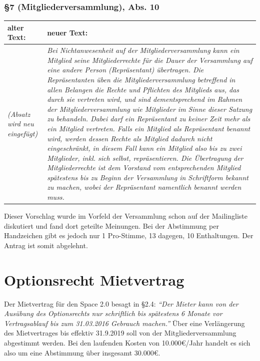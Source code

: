 \documentclass[a4paper,12pt]{scrartcl}
\begin{document}
\newpage
\subsubsection*{§7 (Mitgliederversammlung), Abs. 10}
\begin{longtable}[c]{@{}ll@{}}
\toprule
\begin{minipage}[b]{0.47\columnwidth}\raggedright\strut
alter Text:
\strut\end{minipage} &
\begin{minipage}[b]{0.47\columnwidth}\raggedright\strut
neuer Text:
\strut\end{minipage}\tabularnewline
\midrule
\endhead
\begin{minipage}[t]{0.47\columnwidth}\raggedright\strut
\emph{(Absatz wird neu eingefügt)}
\strut\end{minipage} &
\begin{minipage}[t]{0.47\columnwidth}\raggedright\strut
\emph{Bei Nichtanwesenheit auf der Mitgliederversammlung kann ein Mitglied
seine Mitgliederrechte für die Dauer der Versammlung auf eine andere
Person (Repräsentant) übertragen. Die Repräsentanten üben die
Mitgliederversammlung betreffend in allen Belangen die Rechte und
Pflichten des Mitglieds aus, das durch sie vertreten wird, und sind
dementsprechend im Rahmen der Mitgliederversammlung wie Mitglieder im
Sinne dieser Satzung zu behandeln. Dabei darf ein Repräsentant zu keiner
Zeit mehr als ein Mitglied vertreten. Falls ein Mitglied als
Repräsentant benannt wird, werden dessen Rechte als Mitglied dadurch
nicht eingeschränkt, in diesem Fall kann ein Mitglied also bis zu zwei
Mitglieder, inkl. sich selbst, repräsentieren. Die Übertragung der
Mitgliederrechte ist dem Vorstand vom entsprechenden Mitglied spätestens
bis zu Beginn der Versammlung in Schriftform bekannt zu machen, wobei
der Repräsentant namentlich benannt werden muss.}
\strut\end{minipage}\tabularnewline
\bottomrule
\end{longtable}

Dieser Vorschlag wurde im Vorfeld der Versammlung schon auf der Mailingliste
diskutiert und fand dort geteilte Meinungen. Bei der Abstimmung per Handzeichen
gibt es jedoch nur 1 Pro-Stimme, 13 dagegen, 10 Enthaltungen. Der Antrag ist
somit abgelehnt.


\section{Optionsrecht Mietvertrag}
Der Mietvertrag für den Space 2.0 besagt in §2.4: \emph{"`Der Mieter kann von
der Ausübung des Optionsrechts nur schriftlich bis spätestens 6 Monate vor
Vertragsablauf bis zum 31.03.2016 Gebrauch machen."'} Über eine Verlängerung des
Mietvertrages bis effektiv 31.9.2019 soll von der Mitgliederversammlung
abgestimmt werden. Bei den laufenden Kosten von 10.000€/Jahr handelt es sich
also um eine Abstimmung über insgesamt 30.000€.
\end{document}
